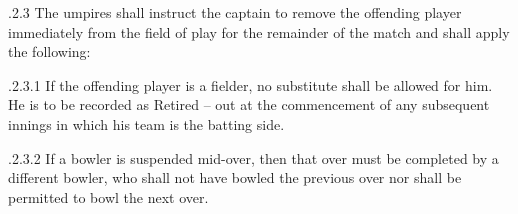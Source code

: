 \documentclass[12pt]{article}
\begin{document}
\vspace{\baselineskip}

\vspace{\baselineskip}

\vspace{\baselineskip}

\vspace{\baselineskip}
\begin{Center}
{\fontsize{8pt}{9.6pt}\par}
\end{Center}\par


\vspace{\baselineskip}

\vspace{\baselineskip}
\begin{adjustwidth}{1.18in}{0.07in}
{\fontsize{9pt}{10.8pt}.2.3 \tabto{1.17in} The umpires shall instruct the captain to remove the offending player immediately from the field of play for the remainder of the match and shall apply the following:\par}\par

\end{adjustwidth}


\vspace{\baselineskip}
\begin{adjustwidth}{1.97in}{0.06in}
\begin{justify}
{\fontsize{9pt}{10.8pt}.2.3.1 \tabto{1.96in} If the offending player is a fielder, no substitute shall be allowed for him. He is to be recorded as Retired – out at the commencement of any subsequent innings in which his team is the batting side.\par}
\end{justify}\par

\end{adjustwidth}


\vspace{\baselineskip}
\begin{adjustwidth}{1.97in}{0.47in}
\begin{justify}
{\fontsize{9pt}{10.8pt}.2.3.2 \tabto{1.96in} If a bowler is suspended mid-over, then that over must be completed by a different bowler, who shall not have bowled the previous over nor shall be permitted to bowl the next over.\par}
\end{justify}\par

\end{adjustwidth}
\end{document}
